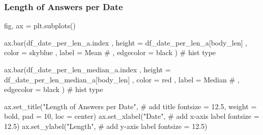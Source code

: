 \documentclass[
  letterpaper,
  DIV=11,
  numbers=noendperiod]{scrartcl}
\newenvironment{Shaded}{\begin{snugshade}}{\end{snugshade}}
\newcommand{\CommentTok}[1]{\textcolor[rgb]{0.37,0.37,0.37}{#1}}
\newcommand{\DecValTok}[1]{\textcolor[rgb]{0.68,0.00,0.00}{#1}}
\newcommand{\FloatTok}[1]{\textcolor[rgb]{0.68,0.00,0.00}{#1}}
\newcommand{\NormalTok}[1]{\textcolor[rgb]{0.00,0.23,0.31}{#1}}
\newcommand{\OperatorTok}[1]{\textcolor[rgb]{0.37,0.37,0.37}{#1}}
\newcommand{\StringTok}[1]{\textcolor[rgb]{0.13,0.47,0.30}{#1}}
\begin{document}
\subsubsection{Length of Answers per
Date}\label{length-of-answers-per-date}

\begin{Shaded}
\begin{Highlighting}[]
\NormalTok{fig, ax }\OperatorTok{=}\NormalTok{ plt.subplots()}

\NormalTok{ax.bar(df\_date\_per\_len\_a.index}
\NormalTok{    ,  height }\OperatorTok{=}\NormalTok{ df\_date\_per\_len\_a[}\StringTok{\textquotesingle{}body\_len\textquotesingle{}}\NormalTok{]}
\NormalTok{    ,  color }\OperatorTok{=} \StringTok{\textquotesingle{}skyblue\textquotesingle{}}
\NormalTok{    ,  label }\OperatorTok{=} \StringTok{\textquotesingle{}Mean\textquotesingle{}}
    \CommentTok{\# ,  edgecolor = \textquotesingle{}black\textquotesingle{}}
\NormalTok{      ) }\CommentTok{\# hist type}

\NormalTok{ax.bar(df\_date\_per\_len\_median\_a.index}
\NormalTok{    ,  height }\OperatorTok{=}\NormalTok{ df\_date\_per\_len\_median\_a[}\StringTok{\textquotesingle{}body\_len\textquotesingle{}}\NormalTok{]}
\NormalTok{    ,  color }\OperatorTok{=} \StringTok{\textquotesingle{}red\textquotesingle{}}
\NormalTok{    ,  label }\OperatorTok{=} \StringTok{\textquotesingle{}Median\textquotesingle{}}
    \CommentTok{\# ,  edgecolor = \textquotesingle{}black\textquotesingle{}}
\NormalTok{      ) }\CommentTok{\# hist type}

\NormalTok{ax.set\_title(}\StringTok{"Length of Answers per Date"}\NormalTok{, }\CommentTok{\# add title}
\NormalTok{             fontsize }\OperatorTok{=} \FloatTok{12.5}\NormalTok{,}
\NormalTok{             weight }\OperatorTok{=} \StringTok{\textquotesingle{}bold\textquotesingle{}}\NormalTok{,}
\NormalTok{             pad }\OperatorTok{=} \DecValTok{10}\NormalTok{,}
\NormalTok{             loc }\OperatorTok{=} \StringTok{\textquotesingle{}center\textquotesingle{}}\NormalTok{)}
\NormalTok{ax.set\_xlabel(}\StringTok{"Date"}\NormalTok{, }\CommentTok{\# add x{-}axis label}
\NormalTok{              fontsize }\OperatorTok{=} \FloatTok{12.5}\NormalTok{)}
\NormalTok{ax.set\_ylabel(}\StringTok{"Length"}\NormalTok{, }\CommentTok{\# add y{-}axis label}
\NormalTok{              fontsize }\OperatorTok{=} \FloatTok{12.5}\NormalTok{)}


\end{Highlighting}
\end{Shaded}
\end{document}

